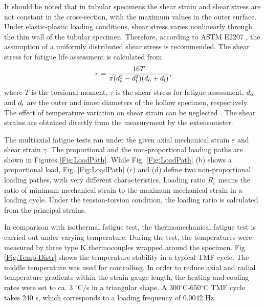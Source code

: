 \documentclass[preprint,5p,twocolumn,11pt,sort&compress]{elsarticle}
\begin{document}
It should be noted that in tubular specimens the shear strain and shear stress are not constant in the cross-section, with the maximum values in the outer surface. Under elastic-plastic loading conditions, shear stress varies nonlinearly through the thin wall of the tubular specimen. Therefore, according to ASTM E2207 \cite{ASTM2014}, the assumption of a uniformly distributed shear stress is recommended. The shear stress for fatigue life assessment is calculated from
\begin{equation}
\tau=\frac{16T}{\pi(d_{\rm o}^2-d_{\rm i}^2)(d_{\rm o}+d_{\rm i})},
\end{equation}
where $T$ is the torsional moment, $\tau$ is the shear stress for fatigue assessment, $d_{\rm o}$ and $d_{\rm i}$ are the outer and inner diameters of the hollow specimen, respectively. The effect of temperature variation on shear strain can be neglected \cite{Bakis2014}. The shear strains are obtained directly from the measurement by the extensometer.

The multiaxial fatigue tests ran under the given axial mechanical strain $\varepsilon$ and shear strain $\gamma$. The proportional and the non-proportional loading paths are shown in Figures \ref{Fig:LoadPath}. While Fig. \ref{Fig:LoadPath} (b) shows a proportional load,  Fig. \ref{Fig:LoadPath} (c) and (d) define two non-proportional loading pathes, with very different characteristics. Loading ratio $R_\varepsilon$ means the ratio of minimum mechanical strain to the maximum mechanical strain in a loading cycle. Under the tension-torsion condition, the loading ratio is calculated from the principal strains.

In comparison with isothermal fatigue test, the thermomechanical fatigue test is carried out under varying temperature. During the test, the temperatures were measured by three type K thermocouples wrapped around the specimen. Fig. \ref{Fig:Temp-Distr} shows the temperature stability in a typical TMF cycle. The middle temperature was used for controlling. In order to  reduce axial and radial temperature gradients within the strain gauge length, the heating and cooling rates were set to ca. 3 $^\circ$C/s in a triangular shape. A 300$^\circ$C-650$^\circ$C TMF cycle takes 240 s, which corresponds to a loading frequency of 0.0042 Hz.

\end{document}
